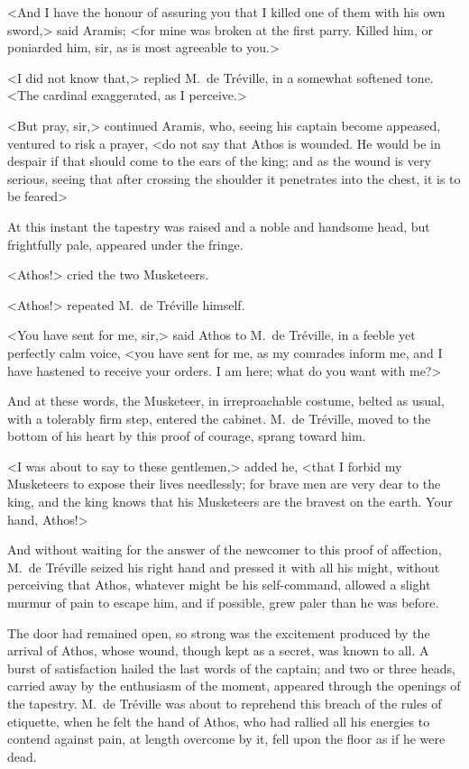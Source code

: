 <And I have the honour of assuring you that I killed one of them with his own sword,> said Aramis; <for mine was broken at the first parry. Killed him, or poniarded him, sir, as is most agreeable to you.> 

<I did not know that,> replied M.~de Tréville, in a somewhat softened tone. <The cardinal exaggerated, as I perceive.> 

<But pray, sir,> continued Aramis, who, seeing his captain become appeased, ventured to risk a prayer, <do not say that Athos is wounded. He would be in despair if that should come to the ears of the king; and as the wound is very serious, seeing that after crossing the shoulder it penetrates into the chest, it is to be feared\longdash> 

At this instant the tapestry was raised and a noble and handsome head, but frightfully pale, appeared under the fringe. 

<Athos!> cried the two Musketeers. 

<Athos!> repeated M.~de Tréville himself. 

<You have sent for me, sir,> said Athos to M.~de Tréville, in a feeble yet perfectly calm voice, <you have sent for me, as my comrades inform me, and I have hastened to receive your orders. I am here; what do you want with me?> 

And at these words, the Musketeer, in irreproachable costume, belted as usual, with a tolerably firm step, entered the cabinet. M.~de Tréville, moved to the bottom of his heart by this proof of courage, sprang toward him. 

<I was about to say to these gentlemen,> added he, <that I forbid my Musketeers to expose their lives needlessly; for brave men are very dear to the king, and the king knows that his Musketeers are the bravest on the earth. Your hand, Athos!> 

And without waiting for the answer of the newcomer to this proof of affection, M.~de Tréville seized his right hand and pressed it with all his might, without perceiving that Athos, whatever might be his self-command, allowed a slight murmur of pain to escape him, and if possible, grew paler than he was before. 

The door had remained open, so strong was the excitement produced by the arrival of Athos, whose wound, though kept as a secret, was known to all. A burst of satisfaction hailed the last words of the captain; and two or three heads, carried away by the enthusiasm of the moment, appeared through the openings of the tapestry. M.~de Tréville was about to reprehend this breach of the rules of etiquette, when he felt the hand of Athos, who had rallied all his energies to contend against pain, at length overcome by it, fell upon the floor as if he were dead. 

